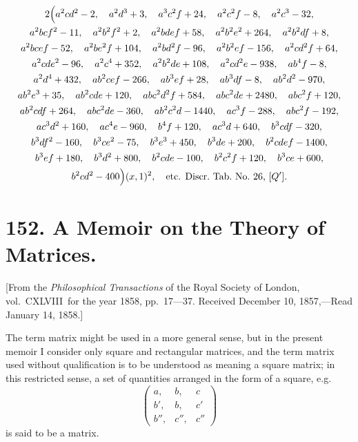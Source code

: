 \documentclass[11pt,a4paper]{book}
\begin{document}
\begin{center}
\begin{multline*}
2\Bigl(
a^2cd^2 - 2,\quad a^2d^3 + 3,\quad a^3c^2f + 24,\quad a^2c^2f - 8,\quad a^2c^3 - 32,\\
a^2bcf^2 - 11,\quad a^2b^2f^2 + 2,\quad a^2bdef + 58,\quad a^2b^2e^2 + 264,\quad a^2b^2df + 8,\\
a^2bcef - 52,\quad a^2be^2f + 104,\quad a^2bd^2f - 96,\quad a^2b^2ef - 156,\quad a^2cd^2f + 64,\\
a^2cde^2 - 96,\quad a^2c^4 + 352,\quad a^2b^2de + 108,\quad a^2cd^2e - 938,\quad ab^4f - 8,\\
a^2d^4 + 432,\quad ab^2cef - 266,\quad ab^3ef + 28,\quad ab^3df - 8,\quad ab^2d^2 - 970,\\
ab^2e^3 + 35,\quad ab^2cde + 120,\quad abc^2d^2f + 584,\quad abc^2de + 2480,\quad abc^2f + 120,\\
ab^2cdf + 264,\quad abc^2de - 360,\quad ab^2c^2d - 1440,\quad ac^3f - 288,\quad abc^2f - 192,\\
ac^3d^2 + 160,\quad ac^4e - 960,\quad b^4f + 120,\quad ac^3d + 640,\quad b^3cdf - 320,\\
b^3df^2 - 160,\quad b^3ce^2 - 75,\quad b^3e^3 + 450,\quad b^3de + 200,\quad b^2cdef - 1400,\\
b^3ef + 180,\quad b^3d^2 + 800,\quad b^2cde - 100,\quad b^2c^2f + 120,\quad b^3ce + 600,\\
b^2cd^2 - 400
\Bigr)(x,1)^2, \quad \text{etc. Discr.~Tab.~No.~26, [$Q'$].}
\end{multline*}

\newpage

\section*{152. A Memoir on the Theory of Matrices.}

[From the \textit{Philosophical Transactions} of the Royal Society of London, vol.~CXLVIII\ for the year 1858, pp.~17---37.
Received December 10, 1857,---Read January 14, 1858.]

\bigskip

The term matrix might be used in a more general sense, but in the present memoir I consider only square and rectangular matrices, and the term matrix used without qualification is to be understood as meaning a square matrix; in this restricted sense, a set of quantities arranged in the form of a square, e.g.
\[
\begin{pmatrix}
a, & b, & c \\
b', & b, & c' \\
b'', & c'', & c''
\end{pmatrix}
\]
is said to be a matrix.


\end{center}
\end{document}
